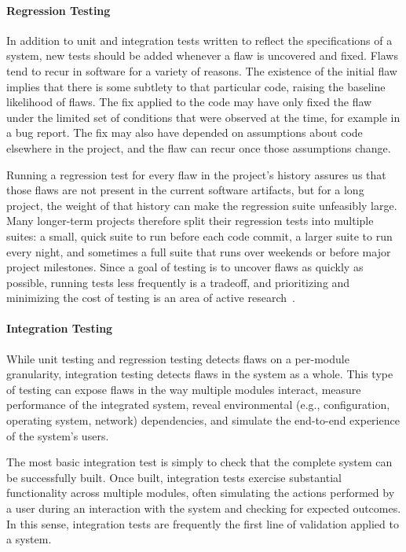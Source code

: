 \paragraph{Regression Testing}

In addition to unit and integration tests written to reflect the
specifications of a system, new tests should be added whenever a flaw
is uncovered and fixed. Flaws tend to recur in software for a variety
of reasons. The existence of the initial flaw implies that there is
some subtlety to that particular code, raising the baseline likelihood
of flaws. The fix applied to the code may have only fixed the flaw
under the limited set of conditions that were observed at the time,
for example in a bug report. The fix may also have depended on
assumptions about code elsewhere in the project, and the flaw can
recur once those assumptions change.

Running a regression test for every flaw in the project's history
assures us that those flaws are not present in the current software
artifacts, but for a long project, the weight of that history can make
the regression suite unfeasibly large. Many longer-term projects
therefore split their regression tests into multiple suites: a small,
quick suite to run before each code commit, a larger suite to run
every night, and sometimes a full suite that runs over weekends or
before major project milestones. Since a goal of testing is to uncover
flaws as quickly as possible, running tests less frequently is a
tradeoff, and prioritizing and minimizing the cost of testing is an
area of active research~\cite{yoo2012regression}.

\paragraph{Integration Testing}

While unit testing and regression testing detects flaws on a
per-module granularity, integration testing detects flaws in the
system as a whole. This type of testing can expose flaws in the way
multiple modules interact, measure performance of the integrated
system, reveal environmental (e.g., configuration, operating system,
network) dependencies, and simulate the end-to-end experience of the
system's users.

The most basic integration test is simply to check that the complete
system can be successfully built. Once built, integration tests
exercise substantial functionality across multiple modules, often
simulating the actions performed by a user during an interaction with
the system and checking for expected outcomes. In this sense,
integration tests are frequently the first line of validation applied
to a system.

